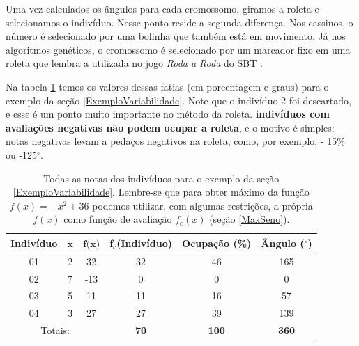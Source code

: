 	Uma vez calculados os ângulos para cada cromossomo, giramos a roleta e selecionamos o indivíduo. Nesse ponto reside a segunda diferença. Nos cassinos, o número é selecionado por uma bolinha que também está em movimento. Já nos algoritmos genéticos, o cromossomo é selecionado por um marcador fixo em uma roleta que lembra a utilizada no jogo \textit{Roda a Roda} do SBT \cite{roda-a-roda}.
	
	Na tabela \ref{tabSumFitness} temos os valores dessas fatias (em porcentagem e graus) para o exemplo da seção \ref{ExemploVariabilidade}. Note que o indivíduo 2 foi descartado, e esse é um ponto muito importante no método da roleta. \textbf{indivíduos com avaliações negativas não podem ocupar a roleta}, e o motivo é simples: notas negativas levam a pedaços negativos na roleta, como, por exemplo, - 15\% ou -125$^\circ$.
		
	\begin{table}[htp]		
		\caption{\label{tabSumFitness}Todas as notas dos indivíduos para o exemplo da seção \ref{ExemploVariabilidade}. Lembre-se que para obter máximo da função $f(x) = -x^2 + 36$ podemos utilizar, com algumas restrições, a própria $f(x)$ como função de avaliação $f_c(x)$ (seção \ref{MaxSeno}).}
		\begin{center}
			\begin{tabular}{c|c|c|c|c|c}
				\hline
				\textbf{Indivíduo}	& $\textbf{x}$		& $\textbf{f(x)}$	& \textbf{f$_c$(Indivíduo)} & \textbf{Ocupação (\%)} & \textbf{Ângulo ($^\circ$)} \\
				\hline
				01	& 2	& 32  & 32 	& 46	& 165 						\\
				02	& 7	& -13 & 0		& 0		& 0						\\
				03	&	5	& 11	& 11	& 16	& 57						\\	
				04	&	3	& 27	& 27	& 39	& 139						\\
				\hline
				\multicolumn{3}{c|}{Totais:}  & \textbf{70} & \textbf{100} & \textbf{360} \\
				\hline
			\end{tabular}
		\end{center}
	\end{table}
	
